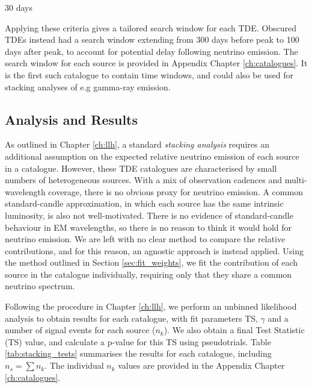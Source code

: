 30 days

Applying these criteria gives a tailored search window for each TDE. Obscured TDEs instead had a search window extending from 300 days before peak to 100 days after peak, to account for potential delay following neutrino emission. The search window for each source is provided in Appendix Chapter \ref{ch:catalogues}. It is the first such catalogue to contain time windows, and could also be used for stacking analyses of e.g gamma-ray emission.

\subsection*{Analysis and Results}

As outlined in Chapter \ref{ch:llh}, a standard \emph{stacking analysis} requires an additional assumption on the expected relative neutrino emission of each source in a catalogue. However, these TDE catalogues are characterised by small numbers of heterogeneous sources. With a mix of observation cadences and multi-wavelength coverage, there is no obvious proxy for neutrino emission. A common standard-candle approximation, in which each source has the same intrinsic luminosity, is also not well-motivated. There is no evidence of standard-candle behaviour in EM wavelengths, so there is no reason to think it would hold for neutrino emission. We are left with no clear method to compare the relative contributions, and for this reason, an agnostic approach is instead applied. Using the method outlined in Section \ref{sec:fit_weights}, we fit the contribution of each source in the catalogue individually, requiring only that they share a common neutrino spectrum.

Following the procedure in Chapter \ref{ch:llh}, we perform an unbinned likelihood analysis to obtain results for each catalogue, with fit parameters TS, $\gamma$ and a number of signal events for each source ($n_{k}$). We also obtain a final Test Statistic (TS) value, and calculate a p-value for this TS using pseudotrials. Table \ref{tab:stacking_tests} summarises the results for each catalogue, including $n_{s} = \sum n_{k}$. The individual $n_{k}$ values are provided in the Appendix Chapter \ref{ch:catalogues}.

